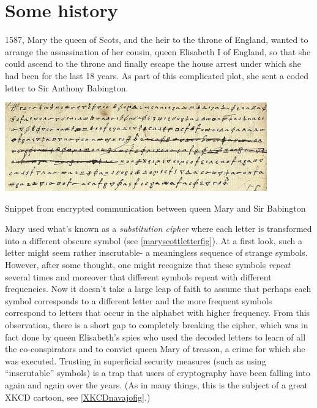 \section{Some history}\label{Some-history}

1587, Mary the queen of Scots, and the heir to the throne of England,
wanted to arrange the assassination of her cousin, queen Elisabeth I of
England, so that she could ascend to the throne and finally escape the
house arrest under which she had been for the last 18 years. As part of
this complicated plot, she sent a coded letter to Sir Anthony Babington.

\begin{marginfigure}
\centering
\includegraphics[width=\linewidth, height=1.5in, keepaspectratio]{../figure/encrypted_letter.jpg}
\caption{Snippet from encrypted communication between queen Mary and Sir
Babington}
\label{maryscottletterfig}
\end{marginfigure}

Mary used what's known as a \emph{substitution cipher} where each letter
is transformed into a different obscure symbol (see
\cref{maryscottletterfig}). At a first look, such a letter might seem
rather inscrutable- a meaningless sequence of strange symbols. However,
after some thought, one might recognize that these symbols \emph{repeat}
several times and moreover that different symbols repeat with different
frequencies. Now it doesn't take a large leap of faith to assume that
perhaps each symbol corresponds to a different letter and the more
frequent symbols correspond to letters that occur in the alphabet with
higher frequency. From this observation, there is a short gap to
completely breaking the cipher, which was in fact done by queen
Elisabeth's spies who used the decoded letters to learn of all the
co-conspirators and to convict queen Mary of treason, a crime for which
she was executed. Trusting in superficial security measures (such as
using ``inscrutable'' symbols) is a trap that users of cryptography have
been falling into again and again over the years. (As in many things,
this is the subject of a great XKCD cartoon, see \cref{XKCDnavajofig}.)

